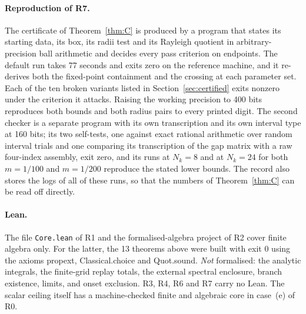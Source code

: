 \documentclass[11pt]{article}
\theoremstyle{definition}
\theoremstyle{remark}
\begin{document}
\paragraph{Reproduction of R7.} The certificate of Theorem~\ref{thm:C} is produced by a program that states its starting data, its box, its radii test and its Rayleigh quotient in arbitrary-precision ball arithmetic and decides every pass criterion on endpoints. The default run takes 77 seconds and exits zero on the reference machine, and it re-derives both the fixed-point containment and the crossing at each parameter set. Each of the ten broken variants listed in Section~\ref{sec:certified} exits nonzero under the criterion it attacks. Raising the working precision to 400 bits reproduces both bounds and both radius pairs to every printed digit. The second checker is a separate program with its own transcription and its own interval type at 160 bits; its two self-tests, one against exact rational arithmetic over random interval trials and one comparing its transcription of the gap matrix with a raw four-index assembly, exit zero, and its runs at $N_k=8$ and at $N_k=24$ for both $m=1/100$ and $m=1/200$ reproduce the stated lower bounds. The record also stores the logs of all of these runs, so that the numbers of Theorem~\ref{thm:C} can be read off directly.

\paragraph{Lean.} The file \texttt{Core.lean} of R1 and the formalised-algebra project of R2 cover finite algebra only. For the latter, the 13 theorems above were built with exit 0 using the axioms propext, Classical.choice and Quot.sound. \emph{Not} formalised: the analytic integrals, the finite-grid replay totals, the external spectral enclosure, branch existence, limits, and onset exclusion. R3, R4, R6 and R7 carry no Lean. The scalar ceiling itself has a machine-checked finite and algebraic core in case~(e) of R0.
\end{document}
